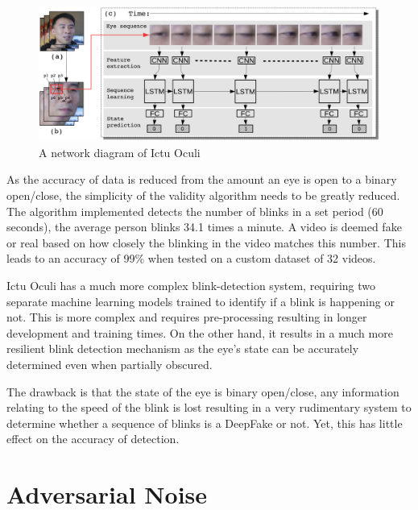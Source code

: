\begin{figure}[h]
    \centering
    \includegraphics[width=0.75\linewidth]{dissertation//figures/ictu-oculi.png}
    \caption{A network diagram of Ictu Oculi\cite{li2018ictu}}
    \label{fig:ictu-oculi}
\end{figure}

As the accuracy of data is reduced from the amount an eye is open to a binary open/close, the simplicity of the validity algorithm needs to be greatly reduced. The algorithm implemented detects the number of blinks in a set period (60 seconds), the average person blinks 34.1 times a minute. A video is deemed fake or real based on how closely the blinking in the video matches this number. This leads to an accuracy of 99\% when tested on a custom dataset of 32 videos.

Ictu Oculi has a much more complex blink-detection system, requiring two separate machine learning models trained to identify if a blink is happening or not. This is more complex and requires pre-processing resulting in longer development and training times. On the other hand, it results in a much more resilient blink detection mechanism as the eye's state can be accurately determined even when partially obscured.

The drawback is that the state of the eye is binary open/close, any information relating to the speed of the blink is lost resulting in a very rudimentary system to determine whether a sequence of blinks is a DeepFake or not. Yet, this has little effect on the accuracy of detection.

\section{Adversarial Noise}


